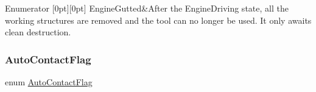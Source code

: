 \begin{DoxyEnumFields}{Enumerator}
[0pt][0pt]{}\mbox{\label{namespaceKatabatic_ab9e409db5feff0bdbc85e90e2a029cdaafb5f961d4cad2bb9fbda71204061c877}} 
Engine\+Gutted&After the Engine\+Driving state, all the working structures are removed and the tool can no longer be used. It only awaits clean destruction. \\
\hline

\end{DoxyEnumFields}
\mbox{\label{namespaceKatabatic_a4950b7142b9024cae2693cd44bccdc24}} 
\subsubsection{\texorpdfstring{Auto\+Contact\+Flag}{AutoContactFlag}}
{\footnotesize\ttfamily enum \mbox{\hyperlink{namespaceKatabatic_a4950b7142b9024cae2693cd44bccdc24}{Auto\+Contact\+Flag}}}

